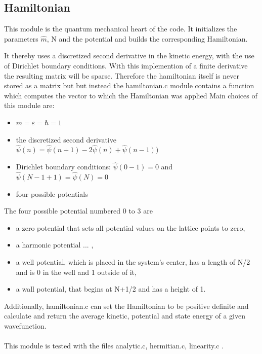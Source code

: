 \documentclass{article}
\begin{document}
\subsection{Hamiltonian}\label{hmltn}
This module is the quantum mechanical heart of the code. It initializes the parameters $\hat{m}$, N and the potential and builds the corresponding Hamiltonian.

It thereby uses a discretized second derivative in the kinetic energy, with the use of Dirichlet boundary conditions.
With this implemention of a finite derivative the resulting matrix will be sparse. Therefore the hamiltonian itself is never stored as a matrix but but instead the {\selectfont hamiltonian.c} module contains a function which computes the vector to which the Hamiltonian was applied
Main choices of this module are:
\begin{itemize}
    \item $m = \varepsilon = \hbar = 1$
    \item the discretized second derivative $\hat{\psi}(n) = \hat{\psi}(n+1)-2\hat{\psi}(n)+\hat{\psi}(n-1))$
    \item Dirichlet boundary conditions: $\hat{\psi}(0-1)=0$ and $\hat{\psi}(N-1+1)=\hat{\psi}(N)=0$
    \item four possible potentials 
\end{itemize}
The four possible potential numbered 0 to 3 are
\begin{itemize}
    \item a zero potential that sets all potential values on the lattice points to zero,
    \item a harmonic potential ...   ,
    \item a well potential, which is placed in the system's center, has a length of N/2 and is 0 in the well and 1 outside of it, 
    \item a wall potential, that begins at N+1/2 and has a height of 1.
\end{itemize}
Additionally, {\selectfont hamiltonian.c} can set the Hamiltonian to be positive definite and calculate and return the average kinetic, potential and state energy of a given wavefunction.\\
\\
This module is tested with the files {\selectfont analytic.c, hermitian.c, linearity.c} . 
\end{document}
